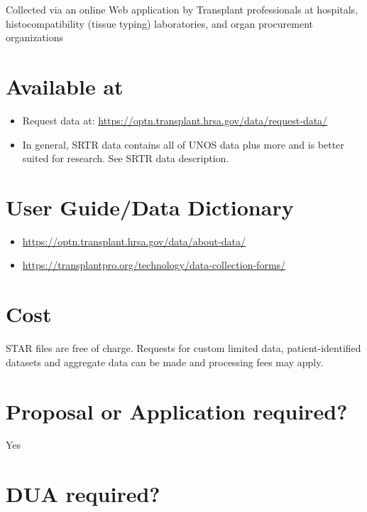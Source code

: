 \documentclass[
]{book}
\providecommand{\tightlist}{%
  \setlength{\itemsep}{0pt}\setlength{\parskip}{0pt}}
\begin{document}
Collected via an online Web application by Transplant professionals at hospitals, histocompatibility (tissue typing) laboratories, and organ procurement organizations

\hypertarget{available-at-90}{%
\section{Available at}\label{available-at-90}}

\begin{itemize}
\tightlist
\item
  Request data at: \url{https://optn.transplant.hrsa.gov/data/request-data/}
\item
  In general, SRTR data contains all of UNOS data plus more and is better suited for research. See SRTR data description.
\end{itemize}

\hypertarget{user-guidedata-dictionary-90}{%
\section{User Guide/Data Dictionary}\label{user-guidedata-dictionary-90}}

\begin{itemize}
\tightlist
\item
  \url{https://optn.transplant.hrsa.gov/data/about-data/}
\item
  \url{https://transplantpro.org/technology/data-collection-forms/}
\end{itemize}

\hypertarget{cost-90}{%
\section{Cost}\label{cost-90}}

STAR files are free of charge. Requests for custom limited data, patient-identified datasets and aggregate data can be made and processing fees may apply.

\hypertarget{proposal-or-application-required-90}{%
\section{Proposal or Application required?}\label{proposal-or-application-required-90}}

Yes

\hypertarget{dua-required-90}{%
\section{DUA required?}\label{dua-required-90}}
\end{document}
